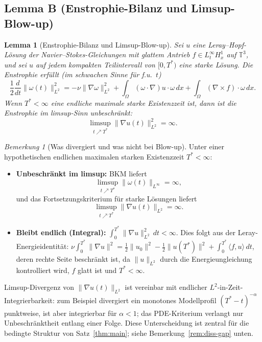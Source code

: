 \documentclass[12pt,a4paper]{article}
\theoremstyle{definition}
\theoremstyle{plain}
\newtheorem{lemma}[definition]{Lemma}
\theoremstyle{remark}
\newtheorem{remark}[definition]{Bemerkung}
\begin{document}
\subsection*{Lemma B (Enstrophie-Bilanz und Limsup-Blow-up)}
\begin{lemma}[Enstrophie-Bilanz und Limsup-Blow-up]
\label{lem:enstrophy}
Sei $u$ eine Leray--Hopf-Lösung der Navier--Stokes-Gleichungen mit glattem
Antrieb $f \in L^\infty_t H^1_x$ auf $\mathbb{T}^3$, und sei $u$ auf jedem
kompakten Teilintervall von $[0,T^*)$ eine starke Lösung. Die Enstrophie
erfüllt (im schwachen Sinne für f.u.\ $t$)
\begin{equation}\label{eq:enstrophy}
    \frac{1}{2}\frac{d}{dt}\|\omega(t)\|_{L^2}^2
    = -\nu\|\nabla\omega\|_{L^2}^2
      + \int_\Omega (\omega\cdot\nabla)u\cdot\omega\,dx
      + \int_\Omega (\nabla\times f)\cdot\omega\,dx.
\end{equation}
Wenn $T^*<\infty$ eine endliche maximale starke Existenzzeit ist, dann
ist die Enstrophie im limsup-Sinn unbeschränkt:
\begin{equation}\label{eq:diss-blowup}
    \limsup_{t \nearrow T^*}\|\nabla u(t)\|_{L^2}^2 = \infty.
\end{equation}
\end{lemma}

\begin{remark}[Was divergiert und was nicht bei Blow-up]
\label{rem:divergence-landscape}
Unter einer hypothetischen endlichen maximalen starken Existenzzeit
$T^* < \infty$:
\begin{itemize}
  \item \textbf{Unbeschränkt im limsup:}\;
    BKM liefert
    \[
      \limsup_{t\nearrow T^*}\|\omega(t)\|_{L^\infty} = \infty,
    \]
    und das Fortsetzungskriterium für starke Lösungen liefert
    \[
      \limsup_{t\nearrow T^*}\|\nabla u(t)\|_{L^2} = \infty.
    \]
  \item \textbf{Bleibt endlich (Integral):}\;
    $\int_0^{T^*}\|\nabla u\|_{L^2}^2\,dt < \infty$.
    Dies folgt aus der Leray-Energieidentität:
    $\nu\int_0^{T^*}\|\nabla u\|^2
    = \tfrac{1}{2}\|u_0\|^2 - \tfrac{1}{2}\|u(T^*)\|^2
    + \int_0^{T^*}\langle f,u\rangle\,dt$,
    deren rechte Seite beschränkt ist, da $\|u\|_{L^2}$ durch die
    Energieungleichung kontrolliert wird, $f$ glatt ist und $T^* < \infty$.
\end{itemize}
Limsup-Divergenz von $\|\nabla u(t)\|_{L^2}$ ist vereinbar mit
endlicher $L^2$-in-Zeit-Integrierbarkeit: zum Beispiel divergiert ein
monotones Modellprofil $(T^*-t)^{-\alpha}$ punktweise, ist aber integrierbar
für $\alpha < 1$; das PDE-Kriterium verlangt nur Unbeschränktheit entlang
einer Folge.
Diese Unterscheidung ist zentral für die bedingte Struktur von
Satz~\ref{thm:main}; siehe Bemerkung~\ref{rem:diss-gap} unten.
\end{remark}
\end{document}
